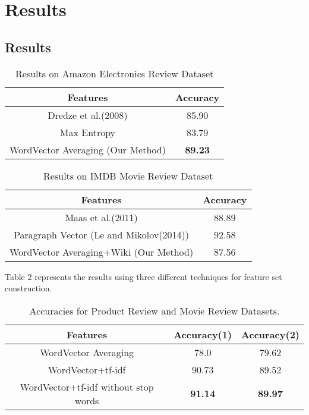 \chapter{Results}
\section{Results}
\begin {table}[h!]
\centering
\begin{tabular}{ | c | c | }
\hline
\textbf{Features} & \textbf{Accuracy} \\ \hline
Dredze et al.(2008) & 85.90\\ \hline
Max Entropy & 83.79\\ \hline
WordVector Averaging (Our Method) & \textbf{89.23}\\ \hline
\end{tabular}
\caption {Results on Amazon Electronics Review Dataset}
\end{table}

\begin {table}[h!]
\centering
\begin{tabular}{ | c | c | }
\hline
\textbf{Features} & \textbf{Accuracy} \\ \hline
Maas et al.(2011) & 88.89\\ \hline
Paragraph Vector (Le and Mikolov(2014)) & 92.58\\ \hline
WordVector Averaging+Wiki (Our Method) & 87.56\\ \hline
\end{tabular}
\caption {Results on IMDB Movie Review Dataset}
\end{table}

Table 2 represents the results using three different techniques for feature set construction.
\begin {table}[h!]
\centering
\begin{tabular}{ | c | c | c | }
\hline
\textbf{Features} & \textbf{Accuracy(1)} & \textbf{Accuracy(2)} \\ \hline
WordVector Averaging & 78.0 & 79.62\\ \hline
WordVector+tf-idf & 90.73 & 89.52\\ \hline
WordVector+tf-idf without stop words & \textbf{91.14} & \textbf{89.97}\\ \hline
\end{tabular}
\caption {Accuracies for Product Review and Movie Review Datasets.}
\end{table}


